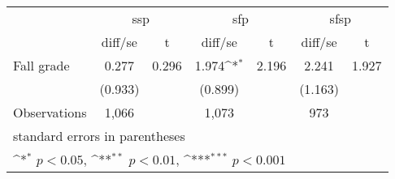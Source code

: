 {
\def\sym#1{\ifmmode^{#1}\else\(^{#1}\)\fi}
\begin{tabular}{l*{3}{cc}}
\hline\hline
                &\multicolumn{2}{c}{ssp}     &\multicolumn{2}{c}{sfp}     &\multicolumn{2}{c}{sfsp}    \\
                &  diff/se         &        t&  diff/se         &        t&  diff/se         &        t\\
\hline
Fall grade      &    0.277         &    0.296&    1.974\sym{*}  &    2.196&    2.241         &    1.927\\
                &  (0.933)         &         &  (0.899)         &         &  (1.163)         &         \\
\hline
Observations    &    1,066         &         &    1,073         &         &      973         &         \\
\hline\hline
\multicolumn{7}{l}{\footnotesize standard errors in parentheses}\\
\multicolumn{7}{l}{\footnotesize \sym{*} \(p<0.05\), \sym{**} \(p<0.01\), \sym{***} \(p<0.001\)}\\
\end{tabular}
}
